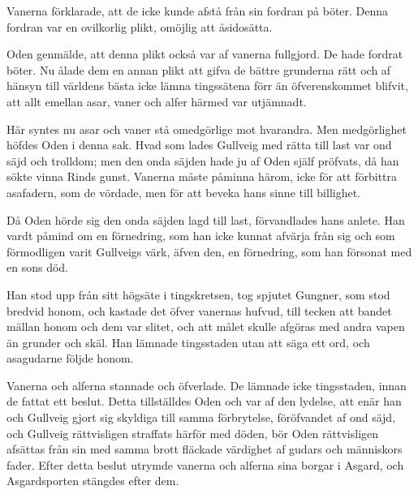 Vanerna förklarade, att de icke kunde afstå från sin fordran på böter.
Denna fordran var en ovilkorlig plikt, omöjlig att åsidosätta.

Oden genmälde, att denna plikt också var af vanerna fullgjord. De hade
fordrat böter. Nu ålade dem en annan plikt att gifva de bättre grunderna
rätt och af hänsyn till världens bästa icke lämna tingssätena förr än
öfverenskommet blifvit, att allt emellan asar, vaner och alfer härmed
var utjämnadt.

Här syntes nu asar och vaner stå omedgörlige mot hvarandra. Men
medgörlighet höfdes Oden i denna sak. Hvad som lades Gullveig med rätta
till last var ond säjd och
trolldom;
men den onda säjden hade ju af Oden själf pröfvats, då han sökte vinna
Rinds gunst. Vanerna måste påminna härom, icke för att förbittra
asafadern, som de vördade, men för att beveka hans sinne till billighet.

Då Oden hörde sig den onda säjden lagd till last, förvandlades hans
anlete. Han vardt påmind om en förnedring, som han icke kunnat afvärja
från sig och som förmodligen varit Gullveigs värk, äfven den, en
förnedring, som han försonat med en sons död.

Han stod upp från sitt högsäte i tingskretsen, tog spjutet Gungner, som
stod bredvid honom, och kastade det öfver vanernas hufvud, till tecken
att bandet mällan honom och dem var slitet, och att målet skulle afgöras
med andra vapen än grunder och skäl. Han lämnade tingsstaden utan att
säga ett ord, och asagudarne följde honom.

Vanerna och alferna stannade och öfverlade. De lämnade icke tingsstaden,
innan de fattat ett beslut. Detta tillställdes Oden och var af den
lydelse, att enär han och Gullveig gjort sig skyldiga till samma
förbrytelse, föröfvandet af ond säjd, och Gullveig rättvisligen
straffats härför med döden, bör Oden rättvisligen afsättas från sin med
samma brott fläckade värdighet af gudars och människors fader. Efter
detta beslut utrymde vanerna och alferna sina borgar i Asgard, och
Asgardsporten stängdes efter dem.

\endSecII


